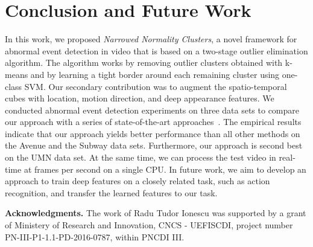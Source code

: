 \documentclass[10pt,twocolumn,letterpaper]{article}
\begin{document}
\vspace*{-0.2cm}
\section{Conclusion and Future Work}
\label{sec_Conclusion}
\vspace*{-0.1cm}

In this work, we proposed \emph{Narrowed Normality Clusters}, a novel framework for abnormal event detection in video that is based on a two-stage outlier elimination algorithm. The algorithm works by removing outlier clusters obtained with k-means and by learning a tight border around each remaining cluster using one-class SVM. Our secondary contribution was to augment the spatio-temporal cubes with location, motion direction, and deep appearance features.
We conducted abnormal event detection experiments on three data sets to compare our approach with a series of state-of-the-art approaches~\cite{Cheng-CVPR-2015,Cong-CVPR-2011,Giorno-ECCV-2016,Hasan-CVPR-2016,Hinami-ICCV-2017,Ionescu-ICCV-2017,Liu-CVPR-2018,Lu-ICCV-2013,Luo-ICCV-2017,Mehran-CVPR-2009,Ravanbakhsh-ICIP-2017,Saligrama-CVPR-2012,Smeureanu-ICIAP-2017,Sun-PR-2017,Zhang-PR-2016}. The empirical results indicate that our approach yields better performance than all other methods on the Avenue and the Subway data sets. Furthermore, our approach is second best on the UMN data set. At the same time, we can process the test video in real-time at  frames per second on a single CPU. In future work, we aim to develop an approach to train deep features on a closely related task, such as action recognition, and transfer the learned features to our task.


\vspace*{0.3cm}
\noindent
{\bf Acknowledgments.}
The work of Radu Tudor Ionescu was supported by a grant of Ministery of Research and Innovation, CNCS - UEFISCDI, project number PN-III-P1-1.1-PD-2016-0787, within PNCDI III.


{\small


}
\end{document}
